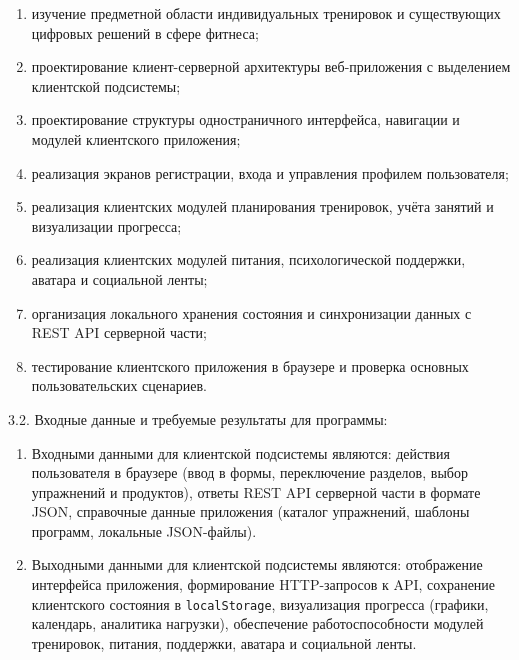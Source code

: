 \begin{enumerate}
\item изучение предметной области индивидуальных тренировок и существующих цифровых решений в сфере фитнеса;
\item проектирование клиент-серверной архитектуры веб-приложения с выделением клиентской подсистемы;
\item проектирование структуры одностраничного интерфейса, навигации и модулей клиентского приложения;
\item реализация экранов регистрации, входа и управления профилем пользователя;
\item реализация клиентских модулей планирования тренировок, учёта занятий и визуализации прогресса;
\item реализация клиентских модулей питания, психологической поддержки, аватара и социальной ленты;
\item организация локального хранения состояния и синхронизации данных с REST API серверной части;
\item тестирование клиентского приложения в браузере и проверка основных пользовательских сценариев.
\end{enumerate}

{\parindent0pt
  3.2. Входные данные и требуемые результаты для программы:}

\begin{enumerate}
\item Входными данными для клиентской подсистемы являются: действия пользователя в браузере (ввод в формы, переключение разделов, выбор упражнений и продуктов), ответы REST API серверной части в формате JSON, справочные данные приложения (каталог упражнений, шаблоны программ, локальные JSON-файлы).
\item Выходными данными для клиентской подсистемы являются: отображение интерфейса приложения, формирование HTTP-запросов к API, сохранение клиентского состояния в \texttt{localStorage}, визуализация прогресса (графики, календарь, аналитика нагрузки), обеспечение работоспособности модулей тренировок, питания, поддержки, аватара и социальной ленты.
\end{enumerate}

